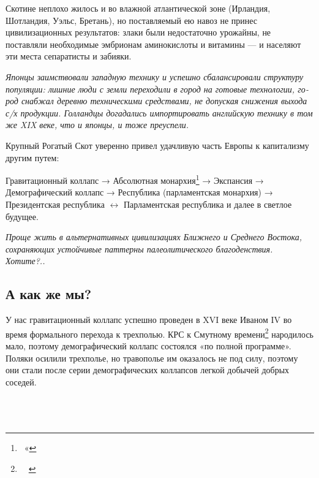 \documentclass[twoside,a4paper]{article}
\begin{document}
{
Скотине неплохо жилось и во влажной атлантической зоне (Ирландия, Шотландия, Уэльс, Бретань), но поставляемый ею навоз
не принес цивилизационных результатов: злаки были недостаточно урожайны, не поставляли необходимые эмбрионам
аминокислоты и витамины — и населяют эти места сепаратисты и забияки.}

{\itshape
\foreignlanguage{russian}{Японцы заимствовали западную технику и успешно сбалансировали структуру популяции: лишние люди
с земли переходили в город на готовые технологии, город снабжал деревню техническими средствами, не допуская снижения
выхода с/х продукции. Голландцы догадались импортировать английскую технику в том же }XIX\foreignlanguage{russian}{
веке, что и японцы, и тоже преуспели.}}

{
Крупный Рогатый Скот уверенно привел удачливую часть Европы к капитализму другим путем:}

{
Гравитационный коллапс → Абсолютная монархия\footnote{\ « } → Экспансия → Демографический коллапс → Республика (парламентская
монархия) → Президентская республика $\leftrightarrow $ Парламентская республика и далее в светлое будущее.}

{\itshape
Проще жить в альтернативных цивилизациях Ближнего и Среднего Востока, сохраняющих устойчивые паттерны палеолитического
благоденствия. Хотите?..}

\subsection[А как же мы? ]{\rmfamily А как же мы? }
{
У нас гравитационный коллапс успешно проведен в \foreignlanguage{english}{XVI} веке Иваном \foreignlanguage{english}{IV}
во время формального перехода к трехполью. КРС к Смутному времени\footnote{\ \ } народилось мало, поэтому
демографический коллапс состоялся «по полной программе». Поляки осилили трехполье, но травополье им оказалось не под
силу, поэтому они стали после серии демографических коллапсов легкой добычей добрых соседей.
\ \ \ \ \ \ \ \ \ \ \ \ \ \ \ \ \ \ \ \ \ \ \ \ \ \ \ \ \ \ \ \ \ \ \ \ \ \ \ \ \ \ \ \ \ \ \ \ \ \ \ \ \ \ \ \ \ \ \ \ \ \ \ \ \ \ \ \ \ \ \ \ \ \ \ \ \ \ \ \ \ \ \ \ \ \ \ \ \ \ \ \ \ \ \ \ \ \ \ \ \ \ \ \ \ \ \ \ \ \ \ \ \ \ \ \ \ \ \ \ \ \ \ \ \ \ \ \ \ \ \ \ \ \ \ \ \ \ \ \ \ \ \ \ \ \ \ \ \ \ }
\end{document}
